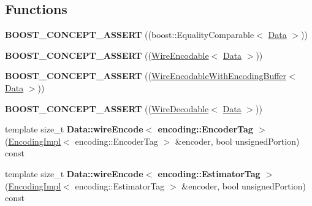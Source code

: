 \subsection*{Functions}
\begin{DoxyCompactItemize}
\item 
{\bfseries B\+O\+O\+S\+T\+\_\+\+C\+O\+N\+C\+E\+P\+T\+\_\+\+A\+S\+S\+E\+RT} ((boost\+::\+Equality\+Comparable$<$ \hyperlink{classndn_1_1Data}{Data} $>$))\hypertarget{namespacendn_a2b0aae9b8576e136b43ccd2be04ee2fc}{}\label{namespacendn_a2b0aae9b8576e136b43ccd2be04ee2fc}

\item 
{\bfseries B\+O\+O\+S\+T\+\_\+\+C\+O\+N\+C\+E\+P\+T\+\_\+\+A\+S\+S\+E\+RT} ((\hyperlink{classndn_1_1WireEncodable}{Wire\+Encodable}$<$ \hyperlink{classndn_1_1Data}{Data} $>$))\hypertarget{namespacendn_ad1ec609d09b3a73c0bab5e6317278573}{}\label{namespacendn_ad1ec609d09b3a73c0bab5e6317278573}

\item 
{\bfseries B\+O\+O\+S\+T\+\_\+\+C\+O\+N\+C\+E\+P\+T\+\_\+\+A\+S\+S\+E\+RT} ((\hyperlink{classndn_1_1WireEncodableWithEncodingBuffer}{Wire\+Encodable\+With\+Encoding\+Buffer}$<$ \hyperlink{classndn_1_1Data}{Data} $>$))\hypertarget{namespacendn_a521adfd248f033806a603adfcca6ca37}{}\label{namespacendn_a521adfd248f033806a603adfcca6ca37}

\item 
{\bfseries B\+O\+O\+S\+T\+\_\+\+C\+O\+N\+C\+E\+P\+T\+\_\+\+A\+S\+S\+E\+RT} ((\hyperlink{classndn_1_1WireDecodable}{Wire\+Decodable}$<$ \hyperlink{classndn_1_1Data}{Data} $>$))\hypertarget{namespacendn_ac0388ef11240c8d3d801ad728601411d}{}\label{namespacendn_ac0388ef11240c8d3d801ad728601411d}

\item 
template size\+\_\+t {\bfseries Data\+::wire\+Encode$<$ encoding\+::\+Encoder\+Tag $>$} (\hyperlink{classndn_1_1encoding_1_1EncodingImpl}{Encoding\+Impl}$<$ encoding\+::\+Encoder\+Tag $>$ \&encoder, bool unsigned\+Portion) const\hypertarget{namespacendn_a231d10c988fa3ee9f8f2105b5fc85e43}{}\label{namespacendn_a231d10c988fa3ee9f8f2105b5fc85e43}

\item 
template size\+\_\+t {\bfseries Data\+::wire\+Encode$<$ encoding\+::\+Estimator\+Tag $>$} (\hyperlink{classndn_1_1encoding_1_1EncodingImpl}{Encoding\+Impl}$<$ encoding\+::\+Estimator\+Tag $>$ \&encoder, bool unsigned\+Portion) const\hypertarget{namespacendn_a85ba4b8477fe5fc06a931ee19934cf2a}{}\label{namespacendn_a85ba4b8477fe5fc06a931ee19934cf2a}


\end{DoxyCompactItemize}

